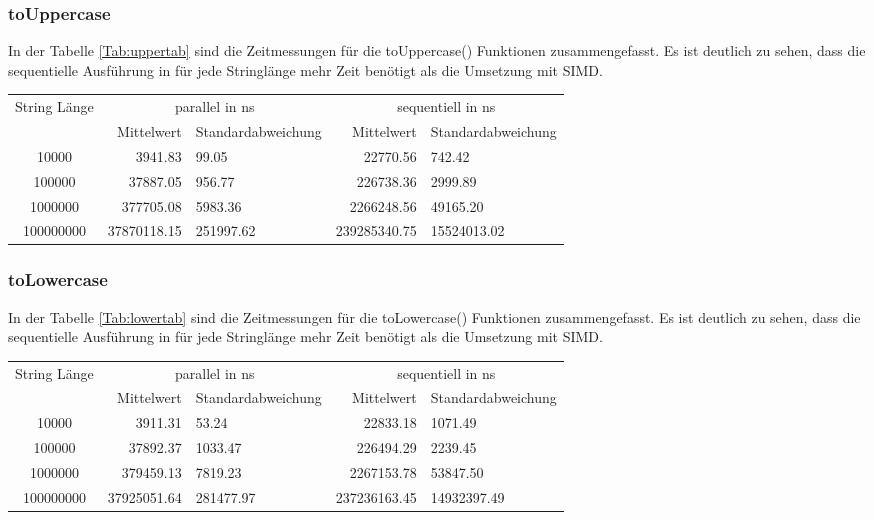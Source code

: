 \documentclass[plainarticle,zihtitle,german,final,hyperref,utf8]{zihpub}
\begin{document}
\subsubsection{toUppercase}
In der Tabelle \ref{Tab:uppertab} sind die Zeitmessungen für die toUppercase() Funktionen zusammengefasst.
Es ist deutlich zu sehen, dass die se­quen­ti­elle Ausführung in für jede Stringlänge mehr Zeit benötigt als die Umsetzung mit SIMD.
\newline
\begin{tabular}{|c|r|l|r|l|}
	\hline
	\multicolumn{1}{|c|}{String Länge} & \multicolumn{2}{c|}{parallel in ns} & \multicolumn{2}{c|}{se­quen­tiell­ in ns} \\
	\cline{2-5}
	& Mittelwert & Standardabweichung  & Mittelwert & Standardabweichung \\
	\hline
	10000 & 3941.83 & 99.05 & 22770.56 & 742.42 \\
	100000 & 37887.05 & 956.77 & 226738.36 & 2999.89 \\
	1000000 & 377705.08 & 5983.36 & 2266248.56 & 49165.20 \\
	100000000 & 37870118.15 & 251997.62 & 239285340.75 & 15524013.02 \\
	\hline
\end{tabular}
\label{Tab:uppertab}


\subsubsection{toLowercase}
In der Tabelle \ref{Tab:lowertab} sind die Zeitmessungen für die toLowercase() Funktionen zusammengefasst.
Es ist deutlich zu sehen, dass die sequentielle Ausführung in für jede Stringlänge mehr Zeit benötigt als die Umsetzung mit SIMD.
\newline
\begin{tabular}{|c|r|l|r|l|}
	\hline
	\multicolumn{1}{|c|}{String Länge} & \multicolumn{2}{c|}{parallel in ns} & \multicolumn{2}{c|}{sequentiell in ns} \\
	\cline{2-5}
	& Mittelwert & Standardabweichung  & Mittelwert & Standardabweichung \\
	\hline
	10000 & 3911.31 & 53.24 & 22833.18 & 1071.49 \\
	100000 & 37892.37 & 1033.47 & 226494.29 & 2239.45 \\
	1000000 & 379459.13 & 7819.23 & 2267153.78 & 53847.50 \\
	100000000 & 37925051.64 & 281477.97 & 237236163.45 & 14932397.49 \\
	\hline
\end{tabular}
\label{Tab:lowertab}
\end{document}
